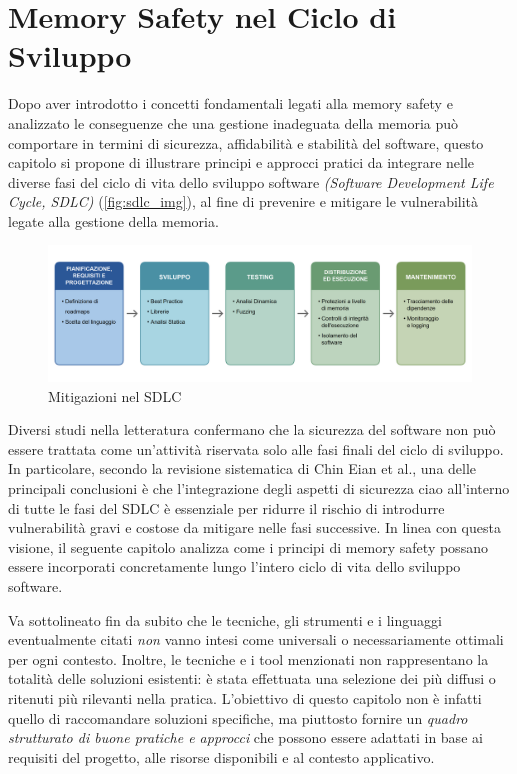 \chapter{Memory Safety nel Ciclo di Sviluppo}
\label{cha:sdlc}

Dopo aver introdotto i concetti fondamentali legati alla memory safety e
analizzato le conseguenze che una gestione inadeguata della memoria può
comportare in termini di sicurezza, affidabilità e stabilità del software,
questo capitolo si propone di illustrare principi e approcci pratici da
integrare nelle diverse fasi del ciclo di vita dello sviluppo software \textit{(Software
Development Life Cycle, SDLC)} (\autoref{fig:sdlc_img}), al fine di prevenire e
mitigare le vulnerabilità legate alla gestione della memoria.

\begin{figure}[htbp]
  \centering
  \includegraphics[width=1\textwidth]{images/sdlc_recap.png}
  \caption[Schema SDLC]{Mitigazioni nel SDLC\protect}
  \label{fig:sdlc_img}
\end{figure}

Diversi studi nella letteratura confermano che la sicurezza del software non può
essere trattata come un'attività riservata solo alle fasi finali del ciclo di sviluppo.
In particolare, secondo la revisione sistematica di Chin Eian et al.\cite{security_in_sdlc},
una delle principali conclusioni è che l'integrazione degli aspetti di sicurezza
ciao all'interno di tutte le fasi del SDLC è essenziale per ridurre il rischio
di introdurre vulnerabilità gravi e costose da mitigare nelle fasi successive. In
linea con questa visione, il seguente capitolo analizza come i principi di
memory safety possano essere incorporati concretamente lungo l'intero ciclo di
vita dello sviluppo software.

Va sottolineato fin da subito che le tecniche, gli strumenti e i linguaggi eventualmente
citati \textit{non} vanno intesi come universali o necessariamente ottimali per
ogni contesto. Inoltre, le tecniche e i tool menzionati non rappresentano la
totalità delle soluzioni esistenti: è stata effettuata una selezione dei più diffusi
o ritenuti più rilevanti nella pratica. L'obiettivo di questo capitolo non è
infatti quello di raccomandare soluzioni specifiche, ma piuttosto fornire un \textit{quadro
strutturato di buone pratiche e approcci} che possono essere adattati in base ai
requisiti del progetto, alle risorse disponibili e al contesto applicativo.





